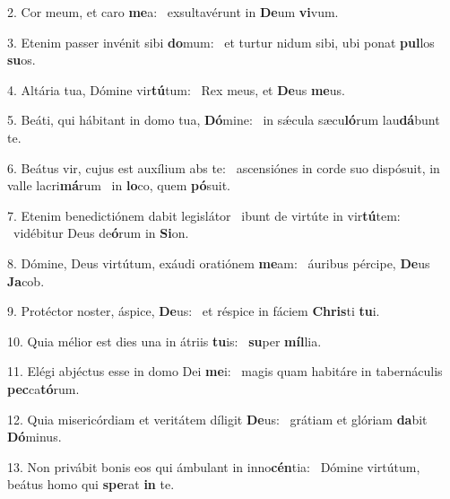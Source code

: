 2. Cor meum, et caro \textbf{me}a: \ast\  exsultavérunt in \textbf{De}um \textbf{vi}vum.\

3. Etenim passer invénit sibi \textbf{do}mum: \ast\  et turtur nidum sibi, ubi ponat \textbf{pul}los \textbf{su}os.\

4. Altária tua, Dómine vir\textbf{tú}tum: \ast\  Rex meus, et \textbf{De}us \textbf{me}us.\

5. Beáti, qui hábitant in domo tua, \textbf{Dó}mine: \ast\  in sǽcula sæcu\textbf{ló}rum lau\textbf{dá}bunt te.\

6. Beátus vir, cujus est auxílium abs te: \dag\  ascensiónes in corde suo dispósuit, in valle lacri\textbf{má}rum \ast\  in \textbf{lo}co, quem \textbf{pó}suit.\

7. Etenim benedictiónem dabit legislátor \dag\  ibunt de virtúte in vir\textbf{tú}tem: \ast\  vidébitur Deus de\textbf{ó}rum in \textbf{Si}on.\

8. Dómine, Deus virtútum, exáudi oratiónem \textbf{me}am: \ast\  áuribus pércipe, \textbf{De}us \textbf{Ja}cob.\

9. Protéctor noster, áspice, \textbf{De}us: \ast\  et réspice in fáciem \textbf{Chris}ti \textbf{tu}i.\

10. Quia mélior est dies una in átriis \textbf{tu}is: \ast\  \textbf{su}per \textbf{míl}lia.\

11. Elégi abjéctus esse in domo Dei \textbf{me}i: \ast\  magis quam habitáre in tabernáculis \textbf{pec}ca\textbf{tó}rum.\

12. Quia misericórdiam et veritátem díligit \textbf{De}us: \ast\  grátiam et glóriam \textbf{da}bit \textbf{Dó}minus.\

13. Non privábit bonis eos qui ámbulant in inno\textbf{cén}tia: \ast\  Dómine virtútum, beátus homo qui \textbf{spe}rat \textbf{in} te.\

